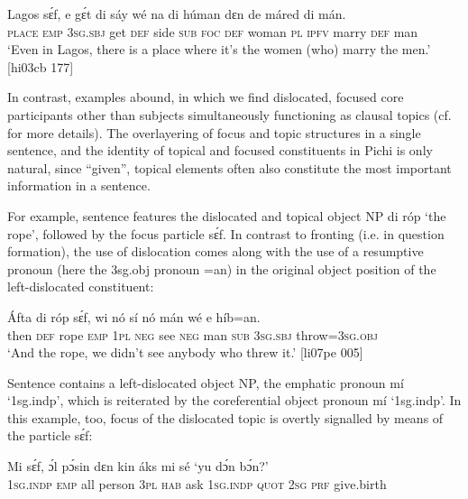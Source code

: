 \ea%
    \label{ex:key:686}
    \gll Lagos  sɛ́f,  e    gɛ́t  di  sáy  wé  na  di  húman  dɛn 
de  máred  di  mán.\\
\textsc{place}  \textsc{emp}  \textsc{3sg.sbj}  get  \textsc{def}  side  \textsc{sub}  \textsc{foc}  \textsc{def}  woman  \textsc{pl} 
\textsc{ipfv}  marry  \textsc{def}  man\\

\glt ‘Even in Lagos, there is a place where it’s the women (who) 
marry the men.’ [hi03cb 177]
\z

In contrast, examples abound, in which we find dislocated, focused core participants other than subjects simultaneously functioning as clausal topics (cf.  for more details). The overlayering of focus and topic structures in a single sentence, and the identity of topical and focused constituents in Pichi is only natural, since “given”, topical elements often also constitute the most important information in a sentence. 


For example, sentence  features the dislocated and topical object NP di róp ‘the rope’, followed by the focus particle sɛ́f. In contrast to fronting (i.e. in question formation), the use of dislocation{\fff} comes along with the use of a resumptive pronoun{\fff} (here the 3sg.obj pronoun =an) in the original object position of the left-dislocated constituent:



\ea%
    \label{ex:key:687}
    \gll \'{A}fta    di  róp    sɛ́f,  wi  nó  sí  nó  mán    wé  e    híb=an.\\
then  \textsc{def}  rope  \textsc{emp}  \textsc{1pl}  \textsc{neg}  see  \textsc{neg}  man    \textsc{sub}  \textsc{3sg.sbj}  throw=\textsc{3sg.obj}\\

\glt ‘And the rope, we didn’t see anybody who threw it.’ [li07pe 005]
\z

Sentence  contains a left-dislocated object NP, the emphatic pronoun mí ‘1sg.indp’, which is reiterated by the coreferential object pronoun mí ‘1sg.indp’. In this example, too, focus of the dislocated topic is overtly signalled by means of the particle sɛ́f:

\ea%
    \label{ex:key:688}
    \gll Mi    sɛ́f,  ɔ́l  pɔ́sin  dɛn  kin  áks  mi    sé
‘yu  dɔ́n  bɔ́n?’\\
\textsc{1sg.indp}  \textsc{emp}  all  person  \textsc{3pl}  \textsc{hab}  ask  \textsc{1sg.indp}  \textsc{quot}
\textsc{2sg}  \textsc{prf}  give.birth\\

